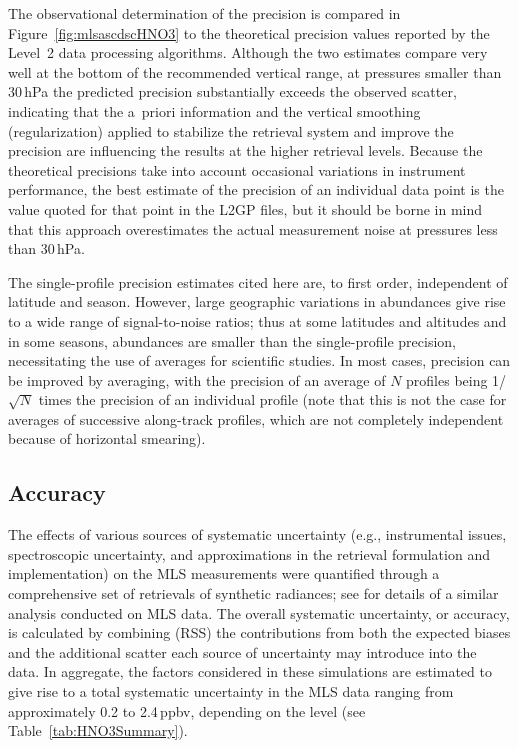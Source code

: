The observational determination of the precision is compared in Figure~\ref{fig:mlsascdscHNO3} to the theoretical precision values reported by the Level~2 data processing algorithms. Although the two estimates compare very well at the bottom of the recommended vertical range, at pressures smaller than 30\,hPa the predicted precision substantially exceeds the observed scatter, indicating that the a~priori information and the vertical smoothing (regularization) applied to stabilize the retrieval system and improve the precision are influencing the results at the higher retrieval levels. Because the theoretical precisions take into account occasional variations in instrument performance, the best estimate of the precision of an individual data point is the value quoted for that point in the L2GP files, but it should be borne in mind that this approach overestimates the actual measurement noise at pressures less than 30\,hPa.

The single-profile precision estimates cited here are, to first order, independent of latitude and season. However, large geographic variations in  abundances give rise to a wide range of signal-to-noise ratios; thus at some latitudes and altitudes and in some seasons,  abundances are smaller than the single-profile precision, necessitating the use of averages for scientific studies. In most cases, precision can be improved by averaging, with the precision of an average of $N$ profiles being 1/$\sqrt{N}$ times the precision of an individual profile (note that this is not the case for averages of successive along-track profiles, which are not completely independent because of horizontal smearing).

\subsection{Accuracy}

The effects of various sources of systematic uncertainty (e.g., instrumental issues, spectroscopic uncertainty, and approximations in the retrieval formulation and implementation) on the MLS \thisv {} measurements were quantified through a comprehensive set of retrievals of synthetic radiances; see \citet{SanteeEtal:2007:HNO3} for details of a similar analysis conducted on MLS \vii {} data. The overall systematic uncertainty, or accuracy, is calculated by combining (RSS) the contributions from both the expected biases and the additional scatter each source of uncertainty may introduce into the data. In aggregate, the factors considered in these simulations are estimated to give rise to a total systematic uncertainty in the MLS \thisv {} data ranging from approximately 0.2 to 2.4\,ppbv, depending on the level (see Table~\ref{tab:HNO3Summary}).

